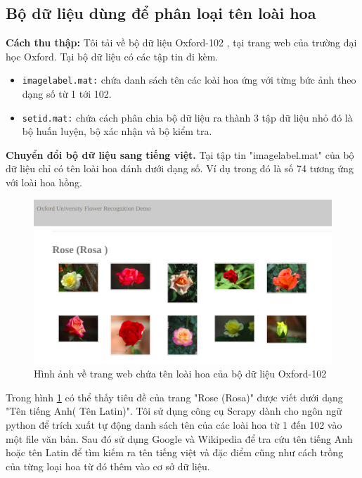 \documentclass[12pt]{report}
\begin{document}
									
		\subsection{Bộ dữ liệu dùng để phân loại tên loài hoa}
										
		\textbf{Cách thu thập:} Tôi tải về bộ dữ liệu Oxford-102 \cite{cia-Nilsback06}, tại trang web của trường đại học Oxford. Tại bộ dữ liệu có các tập tin đi kèm.
		\begin{itemize}
			\item \texttt{imagelabel.mat:} chứa danh sách tên các loài hoa ứng với từng bức ảnh theo dạng số từ 1 tới 102.
			\item \texttt{setid.mat:} chứa cách phân chia bộ dữ liệu ra thành 3 tập dữ liệu nhỏ đó là bộ huấn luyện, bộ xác nhận và bộ kiểm tra.
		\end{itemize}
								
		\textbf{Chuyển đổi bộ dữ liệu sang tiếng việt.}
		Tại tập tin "imagelabel.mat" của bộ dữ liệu chỉ có tên loài hoa đánh dưới dạng số. Ví dụ trong đó là số 74 tương ứng với loài hoa hồng.
								
		\begin{figure}[h]
			\centering
			\includegraphics[scale=0.3]{rose_oxford}
			\caption{Hình ảnh về trang web chứa tên loài hoa của bộ dữ liệu Oxford-102}
			\label{fig:rose_oxford}
		\end{figure}
								
		Trong hình \ref{fig:rose_oxford} có thể thấy tiêu đề của trang "Rose (Rosa)" được viết dưới dạng "Tên tiếng Anh( Tên Latin)". Tôi sử dụng công cụ Scrapy dành cho ngôn ngữ python để trích xuất tự động danh sách tên của các loài hoa từ 1 đến 102 vào một file văn bản. Sau đó sử dụng Google và Wikipedia để tra cứu tên tiếng Anh hoặc tên Latin để tìm kiếm ra tên tiếng việt và đặc điểm cũng như cách trồng của từng loại hoa từ đó thêm vào cơ sở dữ liệu.
										
\end{document}
